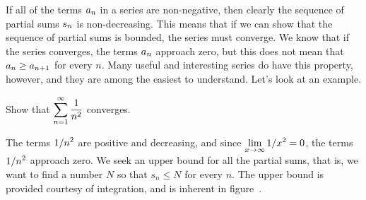 
\nobreak

If all of the terms $\displaystyle a_n$ in a series are non-negative, then clearly 
the sequence of partial sums $\displaystyle s_n$ is non-decreasing. This means that
if we can show that the sequence of partial sums is bounded, the
series must converge. We know that if the series converges, the terms
$\displaystyle a_n$ approach zero, but this does not mean that $\displaystyle a_n\ge a_{n+1}$ for
every $n$. Many useful and interesting series do have this property,
however, and they are among the easiest to understand. Let's look at
an example.

\begin{example} Show that $\displaystyle\sum_{n=1}^\infty {1\over n^2}$ converges.
\par\nobreak\ssk\noindent
The terms $\displaystyle 1/n^2$ are  positive and decreasing, and since 
$\displaystyle\lim_{x\to\infty} 1/x^2=0$, the terms $\displaystyle 1/n^2$ approach zero. We
seek an upper bound for all the partial sums, that is, we want to find
a number $N$ so that $s_n\le N$ for every $n$. The upper bound is
provided courtesy of integration, and is inherent in
figure~.



\end{example}
